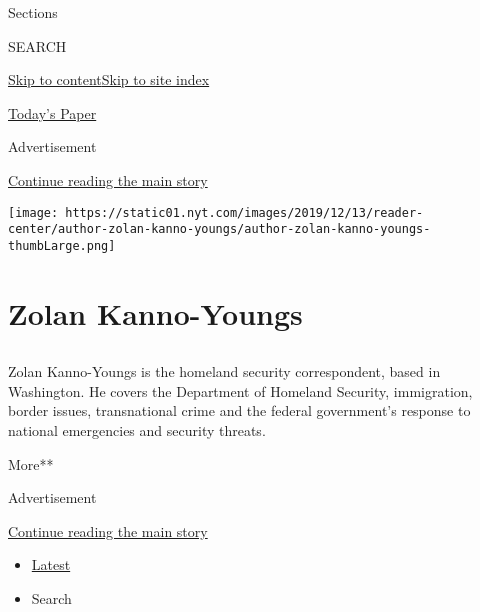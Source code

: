 Sections

SEARCH

\protect\hyperlink{site-content}{Skip to
content}\protect\hyperlink{site-index}{Skip to site index}

\href{https://myaccount.nytimes.com/auth/login?response_type=cookie\&client_id=vi}{}

\href{https://www.nytimes.com/section/todayspaper}{Today's Paper}

Advertisement

\protect\hyperlink{after-top}{Continue reading the main story}

\texttt{[image: https://static01.nyt.com/images/2019/12/13/reader-center/author-zolan-kanno-youngs/author-zolan-kanno-youngs-thumbLarge.png]}

\hypertarget{zolan-kanno-youngs}{%
\section{Zolan Kanno-Youngs}\label{zolan-kanno-youngs}}

\subsection{}

Zolan Kanno-Youngs is the homeland security correspondent, based in
Washington. He covers the Department of Homeland Security, immigration,
border issues, transnational crime and the federal government's response
to national emergencies and security threats.

More**

Advertisement

\protect\hyperlink{after-mid1}{Continue reading the main story}

\begin{itemize}
\tightlist
\item
  \protect\hyperlink{stream-panel}{Latest}
\item
  Search
\end{itemize}

